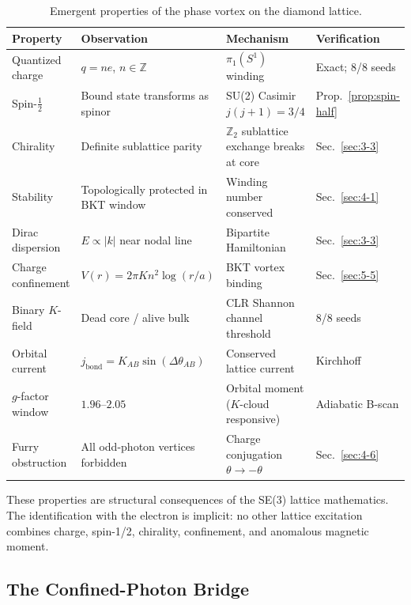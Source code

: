 \documentclass[aps,prd,onecolumn,superscriptaddress,floatfix,12pt]{revtex4-2}
\begin{document}
\begin{table}[t]
\caption{Emergent properties of the phase vortex on the diamond lattice.}
\label{tab:vortex-properties}
\begin{tabular}{llll}
\toprule
Property & Observation & Mechanism & Verification \\
\midrule
Quantized charge & $q = ne$, $n \in \mathbb{Z}$ & $\pi_1(S^1)$ winding & Exact; 8/8 seeds \\
Spin-$\frac{1}{2}$ & Bound state transforms as spinor & SU(2) Casimir $j(j{+}1) = 3/4$ & Prop.~\ref{prop:spin-half} \\
Chirality & Definite sublattice parity & $\mathbb{Z}_2$ sublattice exchange breaks at core & Sec.~\ref{sec:3-3} \\
Stability & Topologically protected in BKT window & Winding number conserved & Sec.~\ref{sec:4-1} \\
Dirac dispersion & $E \propto |k|$ near nodal line & Bipartite Hamiltonian & Sec.~\ref{sec:3-3} \\
Charge confinement & $V(r) = 2\pi K n^2 \log(r/a)$ & BKT vortex binding & Sec.~\ref{sec:5-5} \\
Binary $K$-field & Dead core / alive bulk & CLR Shannon channel threshold & 8/8 seeds \\
Orbital current & $j_{\text{bond}} = K_{AB}\sin(\Delta\theta_{AB})$ & Conserved lattice current\footnotemark & Kirchhoff \\
$g$-factor window & $1.96$--$2.05$ & Orbital moment ($K$-cloud responsive) & Adiabatic B-scan \\
Furry obstruction & All odd-photon vertices forbidden & Charge conjugation $\theta \to -\theta$ & Sec.~\ref{sec:4-6} \\
\bottomrule
\end{tabular}
\end{table}


These properties are structural consequences of the SE(3) lattice mathematics. The identification with the electron is implicit: no other lattice excitation combines charge, spin-1/2, chirality, confinement, and anomalous magnetic moment.

\subsection{The Confined-Photon Bridge}\label{sec:4-5}
\end{document}
